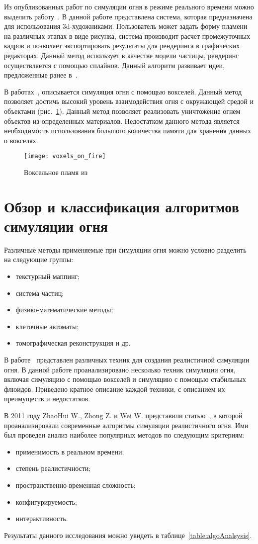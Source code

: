 Из опубликованных работ по симуляции огня в режиме реального времени можно
выделить работу~\cite{turbulence}. В данной работе представлена система, которая
предназначена для использования 3d-художниками. Пользователь может задать форму
пламени на различных этапах в виде рисунка, система производит расчет
промежуточных кадров и позволяет экспортировать результаты для рендеринга в
графических редакторах. Данный метод использует в качестве модели частицы,
рендеринг осуществляется с помощью сплайнов. Данный алгоритм развивает идеи,
предложенные ранее в~\cite{Vanzine2007RealisticRR}.

В работах~\cite{Zhao2003VoxelsOF}, описывается симуляция огня с помощью
вокселей. Данный метод позволяет достичь высокий уровень взаимодействия огня с
окружающей средой и объектами (рис.~\ref{fig:voxelFire}).  Данный метод
позволяет реализовать уничтожение огнем объектов из определенных материалов.
Недостатком данного метода является необходимость использования большого
количества памяти для хранения данных о вокселях.
\begin{figure}[htb]
	\centering
	\texttt{[image: voxels\_on\_fire]}
    \caption{Воксельное пламя из~\cite{Zhao2003VoxelsOF}}%
    \label{fig:voxelFire}
\end{figure}

\section{Обзор и классификация алгоритмов симуляции огня}

Различные методы применяемые при симуляции огня можно условно разделить на
следующие группы:
\begin{itemize}
	\item текстурный маппинг;
	\item система частиц;
	\item физико-математические методы;
	\item клеточные автоматы;
	\item томографическая реконструкция и др.
\end{itemize}

В работе~\cite{realistic_sim} представлен различных техник для создания
реалистичной симуляции огня. В данной работе проанализировано несколько техник
симуляции огня, включая симуляцию с помощью вокселей и симуляцию с помощью
стабильных флюидов. Приведено кратное описание каждой техники, с описанием их
преимуществ и недостатков.

В 2011 году ZhaoHui W., Zhong Z. и Wei W. представили статью~\cite{survey}, в
которой проанализировали современные алгоритмы симуляции реалистичного огня. Ими
был проведен анализ наиболее популярных методов по следующим критериям:
\begin{itemize}
	\item применимость в реальном времени;
	\item степень реалистичности;
	\item пространственно-временная сложность;
	\item конфигурируемость;
	\item интерактивность.
\end{itemize}
Результаты данного исследования можно увидеть в таблице~\ref{table:algoAnalsysis}.

